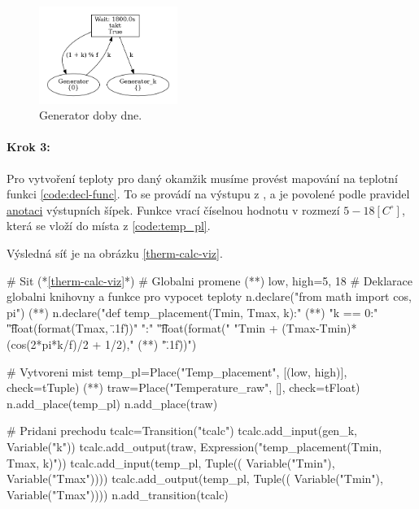\begin{figure}[htb]
 \centering
 \includegraphics[width=0.4\textwidth]{obrazky-figures/therm-gen.png}
 \caption{Generator doby dne.}
 \label{therm-gen-viz}
\end{figure}

\paragraph{Krok 3:}
Pro vytvoření teploty pro daný okamžik musíme provést mapování na teplotní funkci \ref{code:decl-func}. To se provádí na výstupu z , a je povolené podle pravidel \href{https://www.ibisc.univ-evry.fr/~fpommereau/SNAKES/understanding-transition-firing.html}{anotaci} výstupních šípek. Funkce vrací číselnou hodnotu v rozmezí $5-18\left[C^{\circ}\right]$, která se vloží do místa  z \ref{code:temp_pl}.

Výsledná síť je na obrázku \ref{therm-calc-viz}.

\begin{python}
 # Sit (*\ref{therm-calc-viz}*)
 # Globalni promene (*\label{code:therm-calc-draw}*)
 low, high=5, 18
 # Deklarace globalni knihovny a funkce pro vypocet teploty
 n.declare("from math import cos, pi") (*\label{code:decl-libs}*)
 n.declare("def temp_placement(Tmin, Tmax, k):" (*\label{code:decl-func}*)
 "\n\tif k == 0:"
 "\n\t\treturn float(format(Tmax, \".1f\"))"
 "\n\telse:"
 "\n\t\treturn float(format("
 "Tmin + (Tmax-Tmin)*(cos(2*pi*k/f)/2 + 1/2)," (*\label{code:lib-import-usage}*)
 "\".1f\"))")

 # Vytvoreni mist
 temp_pl=Place("Temp_placement", [(low, high)], check=tTuple) (*\label{code:temp_pl}*)
 traw=Place("Temperature_raw", [], check=tFloat)
 n.add_place(temp_pl)
 n.add_place(traw)

 # Pridani prechodu
 tcalc=Transition("tcalc")
 tcalc.add_input(gen_k, Variable("k"))
 tcalc.add_output(traw, Expression("temp_placement(Tmin, Tmax, k)"))
 tcalc.add_input(temp_pl, Tuple((
   Variable("Tmin"), Variable("Tmax"))))
 tcalc.add_output(temp_pl, Tuple((
   Variable("Tmin"), Variable("Tmax"))))
 n.add_transition(tcalc)
\end{python}

